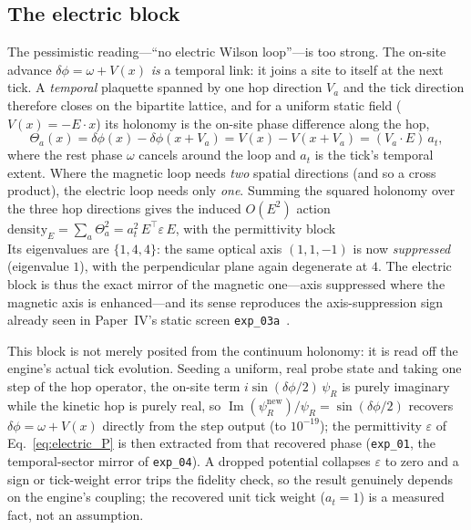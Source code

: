 \subsection{The electric block}
\label{subsec:electric_block}

The pessimistic reading---``no electric Wilson loop''---is too strong. The
on-site advance $\delta\phi=\omega+V(x)$ \emph{is} a temporal link: it joins a
site to itself at the next tick. A \emph{temporal} plaquette spanned by one hop
direction $V_a$ and the tick direction therefore closes on the bipartite lattice,
and for a uniform static field ($V(x)=-E\!\cdot\!x$) its holonomy is the on-site
phase difference along the hop,
%
\begin{equation}
    \label{eq:temporal_holonomy}
    \Theta_a(x) = \delta\phi(x) - \delta\phi(x+V_a)
                = V(x) - V(x+V_a) = (V_a\!\cdot\!E)\,a_t,
\end{equation}
%
where the rest phase $\omega$ cancels around the loop and $a_t$ is the tick's
temporal extent. Where the magnetic loop needs \emph{two} spatial directions
(and so a cross product), the electric loop needs only \emph{one}. Summing the
squared holonomy over the three hop directions gives the induced $O(E^2)$ action
$\text{density}_E=\sum_a\Theta_a^2 = a_t^2\,E^{\!\top}\varepsilon\,E$, with the
permittivity block
%
\begin{equation}
    \label{eq:electric_P}
    
\end{equation}
%
Its eigenvalues are $\{1,4,4\}$: the same optical axis $(1,1,-1)$ is now
\emph{suppressed} (eigenvalue $1$), with the perpendicular plane again degenerate
at $4$. The electric block is thus the exact mirror of the magnetic one---axis
suppressed where the magnetic axis is enhanced---and its sense reproduces the
axis-suppression sign already seen in Paper~IV's static screen
\texttt{exp\_03a}~\cite{PaperIV}.

This block is not merely posited from the continuum holonomy: it is read off the
engine's actual tick evolution. Seeding a uniform, real probe state and taking one
step of the hop operator, the on-site term $i\sin(\delta\phi/2)\,\psi_R$ is purely
imaginary while the kinetic hop is purely real, so
$\operatorname{Im}(\psi_R^{\text{new}})/\psi_R=\sin(\delta\phi/2)$ recovers
$\delta\phi=\omega+V(x)$ directly from the step output (to $10^{-19}$); the
permittivity $\varepsilon$ of Eq.~\eqref{eq:electric_P} is then extracted from
that recovered phase (\texttt{exp\_01}, the temporal-sector mirror of
\texttt{exp\_04}). A dropped potential collapses $\varepsilon$ to zero and a sign
or tick-weight error trips the fidelity check, so the result genuinely depends on
the engine's coupling; the recovered unit tick weight ($a_t=1$) is a measured
fact, not an assumption.

